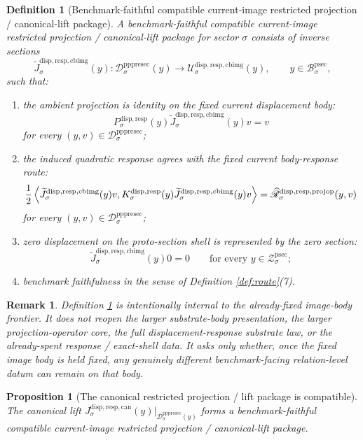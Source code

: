 \documentclass[11pt]{article}
\newcommand{\ProtoSectionBody}[1]{\mathcal B_{#1}^{\mathrm{psec}}}
\newcommand{\ProtoSectionShell}[1]{\mathcal Z_{#1}^{\mathrm{psec}}}
\newcommand{\PrePreProtoSectionResidualBody}[1]{\mathcal D_{#1}^{\mathrm{pppresec}}}
\newcommand{\SubstrateProjection}[1]{P_{#1}^{\mathrm{disp,resp}}}
\newcommand{\SubstrateOperator}[1]{K_{#1}^{\mathrm{disp,resp}}}
\newcommand{\CanonicalLift}[1]{J_{#1}^{\mathrm{disp,resp,can}}}
\newcommand{\CoreForcedBodyResponse}[1]{\widehat{\mathscr R}_{#1}^{\mathrm{disp,resp,projop}}}
\newcommand{\CanonicalImageBody}[1]{\mathcal U_{#1}^{\mathrm{disp,resp,cbimg}}}
\newcommand{\CompatibleImageLift}[1]{\widetilde J_{#1}^{\mathrm{disp,resp,cbimg}}}
\newtheorem{definition}{Definition}
\newtheorem{proposition}{Proposition}
\newtheorem{remark}{Remark}
\begin{document}
\begin{definition}[Benchmark-faithful compatible current-image restricted projection / canonical-lift package]
\label{def:compatible}
A \emph{benchmark-faithful compatible current-image restricted projection / canonical-lift package} for sector \(\sigma\) consists of inverse sections
\[
\CompatibleImageLift{\sigma}(y):
\PrePreProtoSectionResidualBody{\sigma}(y)\to\CanonicalImageBody{\sigma}(y),
\qquad
y\in\ProtoSectionBody{\sigma},
\]
such that:
\begin{enumerate}
    \item the ambient projection is identity on the fixed current displacement body:
    \[
    \SubstrateProjection{\sigma}(y)\CompatibleImageLift{\sigma}(y)v=v
    \]
    for every \((y,v)\in\PrePreProtoSectionResidualBody{\sigma}\);
    \item the induced quadratic response agrees with the fixed current body-response route:
    \[
    \frac{1}{2}
    \ev{
    \CompatibleImageLift{\sigma}(y)v,
    \SubstrateOperator{\sigma}(y)\CompatibleImageLift{\sigma}(y)v
    }
    =
    \CoreForcedBodyResponse{\sigma}(y,v)
    \]
    for every \((y,v)\in\PrePreProtoSectionResidualBody{\sigma}\);
    \item zero displacement on the proto-section shell is represented by the zero section:
    \[
    \CompatibleImageLift{\sigma}(y)0=0
    \qquad
    \text{for every }
    y\in\ProtoSectionShell{\sigma};
    \]
    \item benchmark faithfulness in the sense of Definition \ref{def:route}(7).
\end{enumerate}
\end{definition}

\begin{remark}
Definition \ref{def:compatible} is intentionally internal to the already-fixed image-body frontier. It does not reopen the larger substrate-body presentation, the larger projection-operator core, the full displacement-response substrate law, or the already-spent response / exact-shell data. It asks only whether, once the fixed image body is held fixed, any genuinely different benchmark-facing relation-level datum can remain on that body.
\end{remark}

\begin{proposition}[The canonical restricted projection / lift package is compatible]
\label{prop:exists}
The canonical lift \(\CanonicalLift{\sigma}(y)\big|_{\PrePreProtoSectionResidualBody{\sigma}(y)}\) forms a benchmark-faithful compatible current-image restricted projection / canonical-lift package.
\end{proposition}
\end{document}
